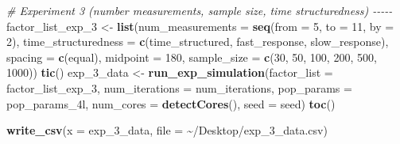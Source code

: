 \documentclass[
12pt, %
twoside,
english]{guelphthesis}
\newenvironment{Shaded}{\begin{snugshade}}{\end{snugshade}}
\newcommand{\AttributeTok}[1]{\textcolor[rgb]{0.13,0.29,0.53}{#1}}
\newcommand{\CommentTok}[1]{\textcolor[rgb]{0.56,0.35,0.01}{\textit{#1}}}
\newcommand{\DecValTok}[1]{\textcolor[rgb]{0.00,0.00,0.81}{#1}}
\newcommand{\FunctionTok}[1]{\textcolor[rgb]{0.13,0.29,0.53}{\textbf{#1}}}
\newcommand{\NormalTok}[1]{#1}
\newcommand{\OtherTok}[1]{\textcolor[rgb]{0.56,0.35,0.01}{#1}}
\newcommand{\StringTok}[1]{\textcolor[rgb]{0.31,0.60,0.02}{#1}}
\begin{document}
\begin{Shaded}
\begin{Highlighting}[numbers=left,,]
\CommentTok{\# Experiment 3 (number measurements, sample size, time structuredness) {-}{-}{-}{-}{-}}
\NormalTok{factor\_list\_exp\_3 }\OtherTok{\textless{}{-}} \FunctionTok{list}\NormalTok{(}\StringTok{\textquotesingle{}num\_measurements\textquotesingle{}} \OtherTok{=} \FunctionTok{seq}\NormalTok{(}\AttributeTok{from =} \DecValTok{5}\NormalTok{, }\AttributeTok{to =} \DecValTok{11}\NormalTok{, }\AttributeTok{by =} \DecValTok{2}\NormalTok{), }
                          \StringTok{\textquotesingle{}time\_structuredness\textquotesingle{}} \OtherTok{=} \FunctionTok{c}\NormalTok{(}\StringTok{\textquotesingle{}time\_structured\textquotesingle{}}\NormalTok{, }\StringTok{\textquotesingle{}fast\_response\textquotesingle{}}\NormalTok{, }\StringTok{\textquotesingle{}slow\_response\textquotesingle{}}\NormalTok{),}
                          \StringTok{\textquotesingle{}spacing\textquotesingle{}} \OtherTok{=} \FunctionTok{c}\NormalTok{(}\StringTok{\textquotesingle{}equal\textquotesingle{}}\NormalTok{), }
                          \StringTok{\textquotesingle{}midpoint\textquotesingle{}} \OtherTok{=} \DecValTok{180}\NormalTok{, }
                          \StringTok{\textquotesingle{}sample\_size\textquotesingle{}} \OtherTok{=} \FunctionTok{c}\NormalTok{(}\DecValTok{30}\NormalTok{, }\DecValTok{50}\NormalTok{, }\DecValTok{100}\NormalTok{, }\DecValTok{200}\NormalTok{, }\DecValTok{500}\NormalTok{, }\DecValTok{1000}\NormalTok{))}
\FunctionTok{tic}\NormalTok{()}
\NormalTok{exp\_3\_data }\OtherTok{\textless{}{-}} \FunctionTok{run\_exp\_simulation}\NormalTok{(}\AttributeTok{factor\_list =}\NormalTok{ factor\_list\_exp\_3, }\AttributeTok{num\_iterations =}\NormalTok{ num\_iterations, }\AttributeTok{pop\_params =}\NormalTok{ pop\_params\_4l, }
                                 \AttributeTok{num\_cores =} \FunctionTok{detectCores}\NormalTok{(), }\AttributeTok{seed =}\NormalTok{ seed)}
\FunctionTok{toc}\NormalTok{()                }

\FunctionTok{write\_csv}\NormalTok{(}\AttributeTok{x =}\NormalTok{ exp\_3\_data, }\AttributeTok{file =} \StringTok{\textquotesingle{}\textasciitilde{}/Desktop/exp\_3\_data.csv\textquotesingle{}}\NormalTok{)}




\end{Highlighting}
\end{Shaded}
\end{document}
